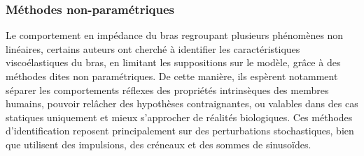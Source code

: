 

\subsubsection{Méthodes non-paramétriques} \label{chap3_sec_st_art_sub_ident_2}

Le comportement en impédance du bras regroupant plusieurs phénomènes non linéaires, certains auteurs \parencite{perreault_multiple-input_1999,ludvig_identification_2011,piovesan_measuring_2012,guarin_unbiased_2018,cavallo_nonparametric_2018} ont cherché à identifier les caractéristiques viscoélastiques du bras, en limitant les suppositions sur le modèle, grâce à des méthodes dites non paramétriques. De cette manière, ils espèrent notamment séparer les comportements réflexes des propriétés intrinsèques des membres humains, pouvoir relâcher des hypothèses contraignantes, ou valables dans des cas statiques uniquement et mieux s'approcher de réalités biologiques. Ces méthodes d'identification reposent principalement sur des perturbations stochastiques, bien que \textcite{piovesan_measuring_2012} utilisent des impulsions, \textcite{guarin_unbiased_2018} des créneaux et \textcite{cavallo_nonparametric_2018} des sommes de sinusoïdes.

